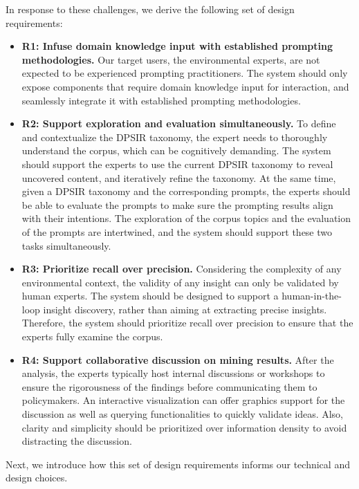 In response to these challenges, we derive the following set of design requirements:
\begin{itemize}[label={}, leftmargin=9px, itemsep=1px, topsep=2px]
    \item \textbf{R1: Infuse domain knowledge input with established prompting methodologies.} 
    Our target users, the environmental experts, are not expected to be experienced prompting practitioners. The system should only expose components that require domain knowledge input for interaction, and seamlessly integrate it with established prompting methodologies. 
    \item \textbf{R2: Support exploration and evaluation simultaneously.} 
    To define and contextualize the DPSIR taxonomy, the expert needs to thoroughly understand the corpus, which can be cognitively demanding. The system should support the experts to use the current DPSIR taxonomy to reveal uncovered content, and iteratively refine the taxonomy. 
    At the same time, given a DPSIR taxonomy and the corresponding prompts, the experts should be able to evaluate the prompts to make sure the prompting results align with their intentions. 
    The exploration of the corpus topics and the evaluation of the prompts are intertwined, and the system should support these two tasks simultaneously.
    \item \textbf{R3: Prioritize recall over precision.}
     Considering the complexity of any environmental context, the validity of any insight can only be validated by human experts. The system should be designed to support a human-in-the-loop insight discovery, rather than aiming at extracting precise insights. Therefore, the system should prioritize recall over precision to ensure that the experts fully examine the corpus.
    \item \textbf{R4: Support collaborative discussion on mining results.} 
    After the analysis, the experts typically host internal discussions or workshops to ensure the rigorousness of the findings before communicating them to policymakers. An interactive visualization can offer graphics support for the discussion as well as querying functionalities to quickly validate ideas. Also, clarity and simplicity should be prioritized over information density to avoid distracting the discussion.
\end{itemize}

\noindent Next, we introduce how this set of design requirements informs our technical and design choices.

